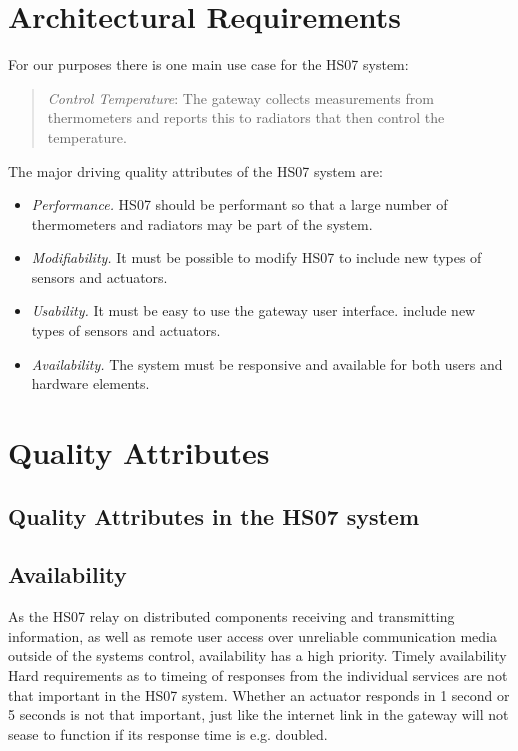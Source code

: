 \documentclass[a4paper,10pt]{article}
\begin{document}
\section{Architectural Requirements}
\label{sec:requirements}

For our purposes there is one main use case for the HS07 system:
\begin{quote}
  \emph{Control Temperature}: The gateway collects measurements from
  thermometers and reports this to radiators that then control the
  temperature.
\end{quote}

The major driving quality attributes of the HS07 system
are:

\begin{itemize}
\item \emph{Performance.} HS07 should be performant so that a large
  number of thermometers and radiators may be part of the system.
\item \emph{Modifiability.} It must be possible to modify HS07 to
  include new types of sensors and actuators.
\item \emph{Usability.} It must be easy to use the gateway user interface.
  include new types of sensors and actuators.
\item \emph{Availability.} The system must be responsive and available for 
both users and hardware elements.
\end{itemize}


\section{Quality Attributes}
\subsection{Quality Attributes in the HS07 system}
\subsection{Availability}
As the HS07 relay on distributed components receiving and transmitting information, as well as remote user access over unreliable communication media outside of the systems control, availability has a high priority.
Timely availability
Hard requirements as to timeing of responses from the individual services are not that important in the HS07 system. Whether an actuator responds in 1 second or 5 seconds is not that important, just like the internet link in the gateway will not sease to function if its response time is e.g. doubled.
\end{document}
